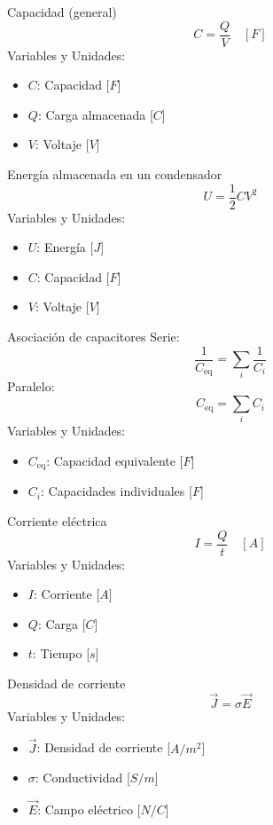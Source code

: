 \begin{landscape}
\begin{multicols}{3}
\begin{teorema}{Capacidad (general)}
    $$C = \frac{Q}{V} \quad [F]$$
    Variables y Unidades:
    \begin{itemize}
        \item $C$: Capacidad [$F$]
        \item $Q$: Carga almacenada [$C$]
        \item $V$: Voltaje [$V$]
    \end{itemize}
\end{teorema}

\begin{teorema}{Energía almacenada en un condensador}
    $$U = \frac{1}{2} C V^2$$
    Variables y Unidades:
    \begin{itemize}
        \item $U$: Energía [$J$]
        \item $C$: Capacidad [$F$]
        \item $V$: Voltaje [$V$]
    \end{itemize}
\end{teorema}

\begin{teorema}{Asociación de capacitores}
    Serie: $$\frac{1}{C_{\text{eq}}} = \sum_i \frac{1}{C_i}$$
    Paralelo: $$C_{\text{eq}} = \sum_i C_i$$
    Variables y Unidades:
    \begin{itemize}
        \item $C_{\text{eq}}$: Capacidad equivalente [$F$]
        \item $C_i$: Capacidades individuales [$F$]
    \end{itemize}
\end{teorema}

\columnbreak

\begin{teorema}{Corriente eléctrica}
    $$ I = \frac{Q}{t} \quad [A]$$
    Variables y Unidades:
    \begin{itemize}
        \item $I$: Corriente [$A$]
        \item $Q$: Carga [$C$]
        \item $t$: Tiempo [$s$]
    \end{itemize}
\end{teorema}

\begin{teorema}{Densidad de corriente}
    $$\vec{J} = \sigma \vec{E}$$
    Variables y Unidades:
    \begin{itemize}
        \item $\vec{J}$: Densidad de corriente [$A/m^2$]
        \item $\sigma$: Conductividad [$S/m$]
        \item $\vec{E}$: Campo eléctrico [$N/C$]
    \end{itemize}
\end{teorema}


\end{multicols}
\end{landscape}
